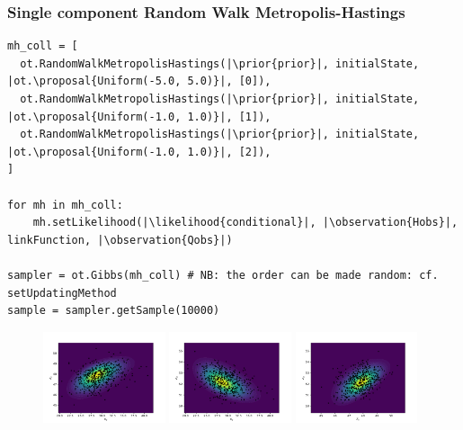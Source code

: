 \documentclass{beamer}
\newcommand{\proposal}[1]{\textcolor{blue}{#1}}
\newcommand{\prior}[1]{\textcolor{red}{#1}}
\newcommand{\likelihood}[1]{\textcolor{green}{#1}}
\newcommand{\observation}[1]{\textcolor{orange}{#1}}
\begin{document}
\begin{frame}[containsverbatim]
    \frametitle{Single component Random Walk Metropolis-Hastings}
    \centering
    \vspace{0.5cm}

    \begin{lstlisting}
mh_coll = [
  ot.RandomWalkMetropolisHastings(|\prior{prior}|, initialState, |ot.\proposal{Uniform(-5.0, 5.0)}|, [0]),
  ot.RandomWalkMetropolisHastings(|\prior{prior}|, initialState, |ot.\proposal{Uniform(-1.0, 1.0)}|, [1]),
  ot.RandomWalkMetropolisHastings(|\prior{prior}|, initialState, |ot.\proposal{Uniform(-1.0, 1.0)}|, [2]),
]

for mh in mh_coll:
    mh.setLikelihood(|\likelihood{conditional}|, |\observation{Hobs}|, linkFunction, |\observation{Qobs}|)

sampler = ot.Gibbs(mh_coll) # NB: the order can be made random: cf. setUpdatingMethod
sample = sampler.getSample(10000)
    \end{lstlisting}

    \begin{figure}
    \includegraphics[width=0.32\textwidth]{figures/crue_gibbs_scmh_Z_v_K_s.pdf}
    \includegraphics[width=0.32\textwidth]{figures/crue_gibbs_scmh_Z_m_K_s.pdf}
    \includegraphics[width=0.32\textwidth]{figures/crue_gibbs_scmh_Z_m_Z_v.pdf}
    \end{figure}
\end{frame}
\end{document}
